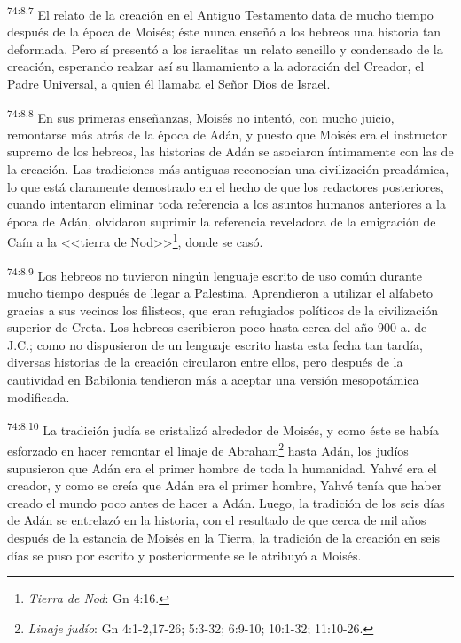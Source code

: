 \par
\textsuperscript{74:8.7} El relato de la creación en el Antiguo Testamento data de mucho tiempo después de la época de Moisés; éste nunca enseñó a los hebreos una historia tan deformada. Pero sí presentó a los israelitas un relato sencillo y condensado de la creación, esperando realzar así su llamamiento a la adoración del Creador, el Padre Universal, a quien él llamaba el Señor Dios de Israel.

\par
\textsuperscript{74:8.8} En sus primeras enseñanzas, Moisés no intentó, con mucho juicio, remontarse más atrás de la época de Adán, y puesto que Moisés era el instructor supremo de los hebreos, las historias de Adán se asociaron íntimamente con las de la creación. Las tradiciones más antiguas reconocían una civilización preadámica, lo que está claramente demostrado en el hecho de que los redactores posteriores, cuando intentaron eliminar toda referencia a los asuntos humanos anteriores a la época de Adán, olvidaron suprimir la referencia reveladora de la emigración de Caín a la <<tierra de Nod>>\footnote{\textit{Tierra de Nod}: Gn 4:16.}, donde se casó.

\par
\textsuperscript{74:8.9} Los hebreos no tuvieron ningún lenguaje escrito de uso común durante mucho tiempo después de llegar a Palestina. Aprendieron a utilizar el alfabeto gracias a sus vecinos los filisteos, que eran refugiados políticos de la civilización superior de Creta. Los hebreos escribieron poco hasta cerca del año 900 a. de J.C.; como no dispusieron de un lenguaje escrito hasta esta fecha tan tardía, diversas historias de la creación circularon entre ellos, pero después de la cautividad en Babilonia tendieron más a aceptar una versión mesopotámica modificada.

\par
\textsuperscript{74:8.10} La tradición judía se cristalizó alrededor de Moisés, y como éste se había esforzado en hacer remontar el linaje de Abraham\footnote{\textit{Linaje judío}: Gn 4:1-2,17-26; 5:3-32; 6:9-10; 10:1-32; 11:10-26.} hasta Adán, los judíos supusieron que Adán era el primer hombre de toda la humanidad. Yahvé era el creador, y como se creía que Adán era el primer hombre, Yahvé tenía que haber creado el mundo poco antes de hacer a Adán. Luego, la tradición de los seis días de Adán se entrelazó en la historia, con el resultado de que cerca de mil años después de la estancia de Moisés en la Tierra, la tradición de la creación en seis días se puso por escrito y posteriormente se le atribuyó a Moisés.

